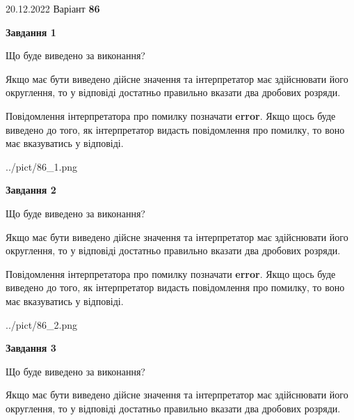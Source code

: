 \documentclass[12pt, ukrainian]{article}
\begin{document}
{20.12.2022 Варіант \No \textbf { 86 }\par}
{
\begin {Large}

{\begin {center}\textbf{Завдання 1}\end {center}}\par
Що буде виведено за виконання? \par

Якщо має бути виведено дійсне значення та інтерпретатор має здійснювати його округлення, 
то у відповіді достатньо правильно вказати два дробових розряди.

Повідомлення інтерпретатора про помилку позначати \textbf{error}.
Якщо щось буде виведено до того, як інтерпретатор видасть повідомлення про помилку, 
то воно має вказуватись у відповіді. \par

\begin{center}
	{../pict/86_1.png}
\end{center}
\newpage

{\begin {center}\textbf{Завдання 2}\end {center}}\par
Що буде виведено за виконання? \par

Якщо має бути виведено дійсне значення та інтерпретатор має здійснювати його округлення, 
то у відповіді достатньо правильно вказати два дробових розряди.

Повідомлення інтерпретатора про помилку позначати \textbf{error}.
Якщо щось буде виведено до того, як інтерпретатор видасть повідомлення про помилку, 
то воно має вказуватись у відповіді. \par

\begin{center}
	{../pict/86_2.png}
\end{center}
\newpage

{\begin {center}\textbf{Завдання 3}\end {center}}\par
Що буде виведено за виконання? \par

Якщо має бути виведено дійсне значення та інтерпретатор має здійснювати його округлення, 
то у відповіді достатньо правильно вказати два дробових розряди.


\end{Large}}
\end{document}
